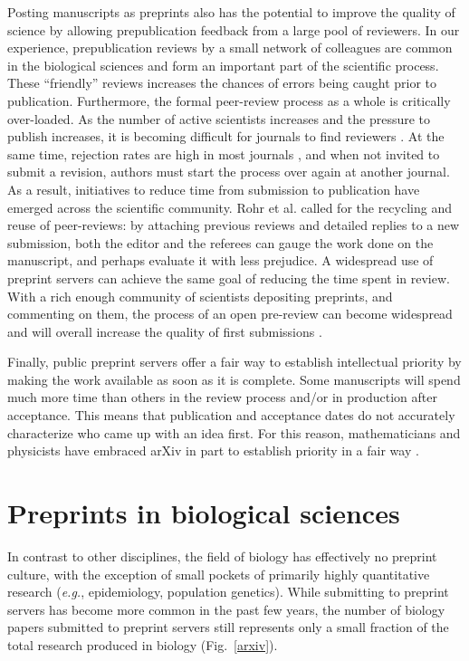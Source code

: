 \documentclass[10pt]{article}
\begin{document}
Posting manuscripts as preprints also has the potential to improve the 
quality of science by allowing prepublication feedback from a large pool of 
reviewers. In our experience, prepublication reviews by a small network of 
colleagues are common in the biological sciences and form an important part 
of the scientific process. These ``friendly'' reviews increases the chances 
of errors being caught prior to publication. Furthermore, the formal 
peer-review process as a whole is critically over-loaded. As the number of 
active scientists increases and the pressure to publish increases, it is 
becoming difficult for journals to find reviewers \cite{hoc09}.  At the same 
time, rejection rates are high in most journals \cite{aar08,roh09}, and when 
not invited to submit a revision, authors must start the process over again 
at another journal. As a result, initiatives to reduce time from submission 
to publication have emerged across the scientific community. Rohr et al.  
\cite{roh09} called for the recycling and reuse of peer-reviews: by 
attaching previous reviews and detailed replies to a new submission, both 
the editor and the referees can gauge the work done on the manuscript, and 
perhaps evaluate it with less prejudice. A widespread use of preprint 
servers can achieve the same goal of reducing the time spent in review. With 
a rich enough community of scientists depositing preprints, and commenting 
on them, the process of an open pre-review can become widespread and will 
overall increase the quality of first submissions \cite{hoc12}.

Finally, public preprint servers offer a fair way to establish intellectual
priority by making the work available as soon as it is complete. Some
manuscripts will spend much more time than others in the review process and/or in
production after acceptance. This means that publication and
acceptance dates do not accurately characterize who came up with an idea
first. For this reason, mathematicians and physicists have embraced arXiv in
part to establish priority in a fair way \cite{gin11,cal12}.

\section*{Preprints in biological sciences}

In contrast to other disciplines, the field of biology has effectively no
preprint culture, with the exception of small pockets of primarily highly
quantitative research (\emph{e.g.}, epidemiology, population genetics).  While
submitting to preprint servers has become more common in the past few years, the
number of biology papers submitted to preprint servers still represents only a
small fraction of the total research produced in biology (Fig.~\ref{arxiv}).
\end{document}
